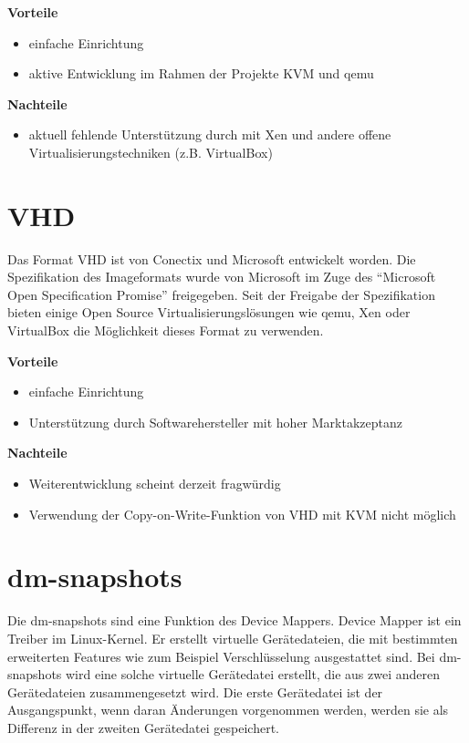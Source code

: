 \textbf{Vorteile}
\begin{itemize}
 \item einfache Einrichtung
 \item aktive Entwicklung im Rahmen der Projekte KVM und qemu
\end{itemize}

\textbf{Nachteile}
\begin{itemize}
 \item aktuell fehlende Unterstützung durch mit Xen und andere offene Virtualisierungstechniken (z.B. VirtualBox)
\end{itemize}

\section{VHD}
Das Format VHD ist von Conectix und Microsoft entwickelt worden. Die Spezifikation des Imageformats wurde von Microsoft im Zuge des ``Microsoft Open Specification Promise'' freigegeben. Seit der Freigabe der Spezifikation bieten einige Open Source Virtualisierungslösungen wie qemu, Xen oder VirtualBox die Möglichkeit dieses Format zu verwenden. \cite{msosp} \cite{vhdspec} 

\textbf{Vorteile}
\begin{itemize}
 \item einfache Einrichtung
 \item Unterstützung durch Softwarehersteller mit hoher Marktakzeptanz
\end{itemize}

\textbf{Nachteile}
\begin{itemize}
 \item Weiterentwicklung scheint derzeit fragwürdig
 \item Verwendung der Copy-on-Write-Funktion von VHD mit KVM nicht möglich
\end{itemize}

\section{dm-snapshots}
Die dm-snapshots sind eine Funktion des Device Mappers. Device Mapper ist ein Treiber im Linux-Kernel. Er erstellt virtuelle Gerätedateien, die mit bestimmten erweiterten Features wie zum Beispiel Verschlüsselung ausgestattet sind. Bei dm-snapshots wird eine solche virtuelle Gerätedatei erstellt, die aus zwei anderen Gerätedateien zusammengesetzt wird. Die erste Gerätedatei ist der Ausgangspunkt, wenn daran Änderungen vorgenommen werden, werden sie als Differenz in der zweiten Gerätedatei gespeichert. 

